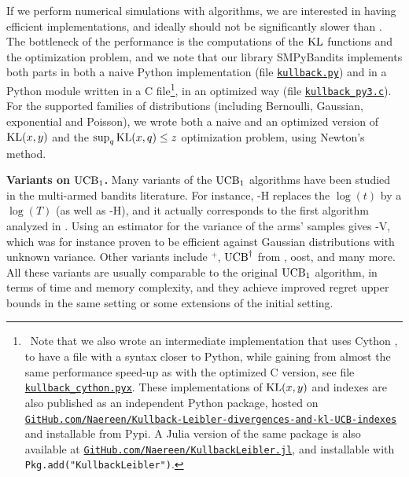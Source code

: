 If we perform numerical simulations with \klUCB{} algorithms, we are interested in having efficient implementations, and ideally \klUCB{} should not be significantly slower than \UCB. The bottleneck of the performance is the computations of the $\mathrm{KL}$ functions and the optimization problem,
and we note that our library SMPyBandits implements both parts in both a naive Python implementation (file \href{https://github.com/SMPyBandits/SMPyBandits/blob/master/SMPyBandits/Policies/kullback.py}{\texttt{kullback.py}}) and in a Python module written in a
C file\footnote{~Note that we also wrote an intermediate implementation that uses Cython \cite{cython}, to have a file with a syntax closer to Python, while gaining from almost the same performance speed-up as with the optimized C version, see file \href{https://github.com/SMPyBandits/SMPyBandits/blob/master/SMPyBandits/Policies/kullback_cython.pyx}{\texttt{kullback\_cython.pyx}}.
    These implementations of $\mathrm{KL}(x,y)$ and \klUCB{} indexes are also published as an independent Python package, hosted on \href{https://github.com/Naereen/Kullback-Leibler-divergences-and-kl-UCB-indexes}{\texttt{GitHub.com/Naereen/Kullback-Leibler-divergences-and-kl-UCB-indexes}} and installable from Pypi.
    A Julia version of the same package is also available at \href{https://github.com/Naereen/KullbackLeibler.jl}{\texttt{GitHub.com/Naereen/KullbackLeibler.jl}},
    and installable with \texttt{Pkg.add("KullbackLeibler")}.
},
in an optimized way (file \href{https://github.com/SMPyBandits/SMPyBandits/blob/master/SMPyBandits/Policies/C/kullback_py3.c}{\texttt{kullback\_py3.c}}).
For the supported families of distributions (including Bernoulli, Gaussian, exponential and Poisson), we wrote both a naive and an optimized version of $\mathrm{KL}(x,y)$ and the $\sup_q \mathrm{KL}(x,q) \leq z$ optimization problem, using Newton's method.


\textbf{Variants on $\mathrm{UCB}_1$.}
%
Many variants of the $\mathrm{UCB}_1$ algorithms have been studied in the multi-armed bandits literature.
For instance, \UCB-H replaces the $\log(t)$ by a $\log(T)$ (as well as \klUCB-H), and it actually corresponds to the first algorithm analyzed in \cite{Auer02}.
Using an estimator for the variance of the arms' samples gives \UCB-V, which was for instance proven to be efficient against Gaussian distributions with unknown variance.
Other variants include \UCB$^+$, $\mathrm{UCB}^{\dagger}$ from \cite{Lattimore2018refining}, {\UCB}oost, and many more.
%
All these variants are usually comparable to the original $\mathrm{UCB}_1$ algorithm, in terms of time and memory complexity, and they achieve improved regret upper bounds in the same setting or some extensions of the initial setting.


